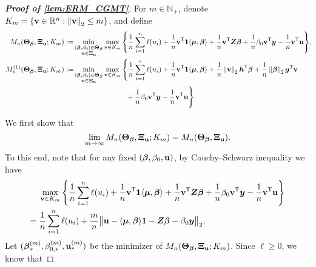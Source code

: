 \begin{proof}[\textbf{Proof of \cref{lem:ERM_CGMT}}]
    For $m \in \mathbb{N}_+$, denote $K_m = \{ \mathrm{\bf v} \in \mathbb{R}^n: \left\|{\mathrm{\bf v}}\right\|_2 \le m \}$, and define
    \begin{align*}
        M_n (\bTheta_{\vbeta}, \bXi_{\bu}; K_m)
        & :=  \!\min_{ \substack{ (\bbeta , \beta_0) \in \bTheta_{\vbeta} \\  \bu \in \bXi_{\bu} } } \max_{ \bv \in K_m } \left\{
        \frac1n \sum_{i=1}^n \ell( u_i )
      + \frac1n \bv^\top \bone \< \bmu, \vbeta \>
      + \frac1n \bv^\top \ZZ \vbeta + \frac1n \beta_0 \bv^\top \yy - \frac1n \bv^\top \bu \right\} \! , \!\! 
      \\
        M_n^{(1)} (\bTheta_{\vbeta}, \bXi_{\bu}; K_m) 
        & :=  \!\min_{ \substack{ (\bbeta , \beta_0) \in \bTheta_{\vbeta} \\  \bu \in \bXi_{\bu} } }
        \max_{ \bv \in K_m }
        \, \Biggl\{
        \frac1n \sum_{i=1}^n \ell( u_i )
        + \frac1n \bv^\top \bone \< \bmu, \vbeta \>
         + \frac1n \norm{\bv}_2 \hh^\top \vbeta + \frac1n \norm{\vbeta}_2 \vg^\top \bv 
         \\
         &
         \phantom{:=  \!\min_{ \substack{ (\bbeta , \beta_0) \in \bTheta_{\vbeta} \\  \bu \in \bXi_{\bu} } }
        \max_{ \bv \in K_m }
        \, \Biggl\{}
         + \frac1n \beta_0 \bv^\top \yy - \frac1n \bv^\top \bu
         \Biggr\}.
    \end{align*}
    We first show that
    \begin{equation*}
        \lim_{m \to \infty} M_n (\text{\boldmath $\Theta$}_{{\boldsymbol{\beta}}}, \text{\boldmath $\Xi$}_{\mathrm{\bf u}}; K_m) = M_n (\text{\boldmath $\Theta$}_{{\boldsymbol{\beta}}}, \text{\boldmath $\Xi$}_{\mathrm{\bf u}}).
    \end{equation*}
    To this end, note that for any fixed $(\text{\boldmath $\beta$} , \beta_0, \mathrm{\bf u})$, by Cauchy--Schwarz inequality we have
    \begin{align}
        & \max_{ \mathrm{\bf v} \in K_m } \left\{
        \frac1n \sum_{i=1}^n \ell( u_i )
        + \frac1n \mathrm{\bf v}^{\sf T} \mathrm{\bf 1} \langle \text{\boldmath $\mu$}, {\boldsymbol{\beta}} \rangle
        + \frac1n \mathrm{\bf v}^{\sf T} \text{\boldmath $Z$} {\boldsymbol{\beta}} + \frac1n \beta_0 \mathrm{\bf v}^{\sf T} \text{\boldmath $y$} - \frac1n \mathrm{\bf v}^{\sf T} \mathrm{\bf u} \right\} 
        \notag \\
        = {} & \frac1n \sum_{i=1}^n \ell( u_i ) + \frac{m}{n} \bigl\|\mathrm{\bf u} - \langle \text{\boldmath $\mu$}, {\boldsymbol{\beta}} \rangle \mathrm{\bf 1} - \text{\boldmath $Z$} {\boldsymbol{\beta}} - \beta_0 \text{\boldmath $y$} \bigr\|_2.
        \label{eq:ell_Mn_ineq}
    \end{align}
    Let $(\text{\boldmath $\beta$}_*^{(m)}, \beta_{0, *}^{(m)}, \mathrm{\bf u}_*^{(m)})$ be the minimizer of $M_n (\text{\boldmath $\Theta$}_{{\boldsymbol{\beta}}}, \text{\boldmath $\Xi$}_{\mathrm{\bf u}}; K_m)$. Since $\ell \ge 0$, we know that

\end{proof}
